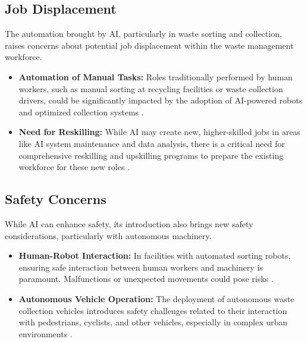 \subsection{Job Displacement}
The automation brought by AI, particularly in waste sorting and collection, raises concerns about potential job displacement within the waste management workforce.
\begin{itemize}
    \item \textbf{Automation of Manual Tasks:} Roles traditionally performed by human workers, such as manual sorting at recycling facilities or waste collection drivers, could be significantly impacted by the adoption of AI-powered robots and optimized collection systems \cite{SustainabilityDirectory_Risks_3}.
    \item \textbf{Need for Reskilling:}
While AI may create new, higher-skilled jobs in areas like AI system maintenance and data analysis, there is a critical need for comprehensive reskilling and upskilling programs to prepare the existing workforce for these new roles \cite{LaracOrg_Risks}.
\end{itemize}

\subsection{Safety Concerns}
While AI can enhance safety, its introduction also brings new safety considerations, particularly with autonomous machinery.
\begin{itemize}
    \item \textbf{Human-Robot Interaction:} In facilities with automated sorting robots, ensuring safe interaction between human workers and machinery is paramount. Malfunctions or unexpected movements could pose risks \cite{WasteManaged_Risks}.
    \item \textbf{Autonomous Vehicle Operation:}
The deployment of autonomous waste collection vehicles introduces safety challenges related to their interaction with pedestrians, cyclists, and other vehicles, especially in complex urban environments \cite{Neuroject_Risks}.
\end{itemize}

